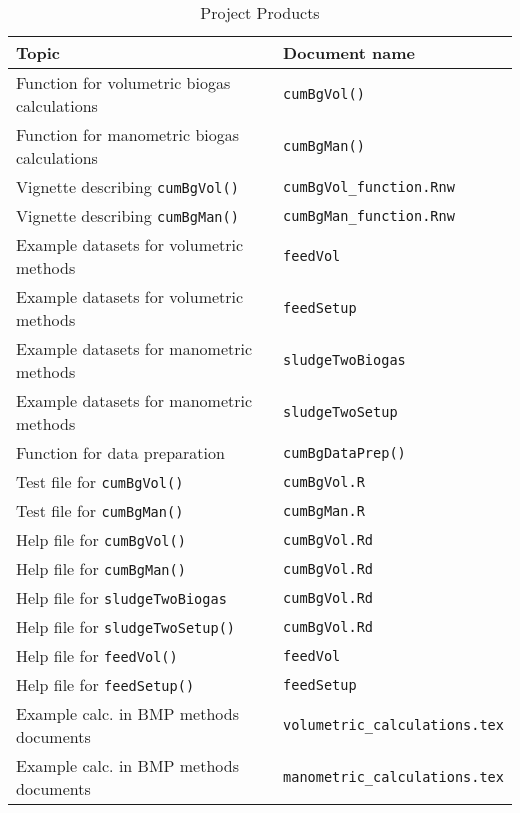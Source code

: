 \documentclass{article}
\begin{document}
\label{products}
\begin{table}[!h]
  \begin{center}
  \caption{Project Products}
  \label{tab:products}
  \vspace{3pt}
  
  \begin{tabular}{ll}
    \hline
    Topic                                         &   Document name \\
    \hline
    Function for volumetric biogas calculations   &   \texttt{cumBgVol()} \\
    Function for manometric biogas calculations   &   \texttt{cumBgMan()} \\
    Vignette describing \texttt{cumBgVol()}       &   \texttt{cumBgVol\_function.Rnw} \\
    Vignette describing \texttt{cumBgMan()}       &   \texttt{cumBgMan\_function.Rnw} \\
    Example datasets for volumetric methods       &   \texttt{feedVol} \\
    Example datasets for volumetric methods       &   \texttt{feedSetup} \\
    Example datasets for manometric methods       &   \texttt{sludgeTwoBiogas} \\ 
    Example datasets for manometric methods       &   \texttt{sludgeTwoSetup} \\
    Function for data preparation                 &   \texttt{cumBgDataPrep()} \\
    Test file for \texttt{cumBgVol()}             &   \texttt{cumBgVol.R} \\
    Test file for \texttt{cumBgMan()}             &   \texttt{cumBgMan.R} \\
    Help file for \texttt{cumBgVol()}             &   \texttt{cumBgVol.Rd} \\
    Help file for \texttt{cumBgMan()}             &   \texttt{cumBgVol.Rd} \\
    Help file for \texttt{sludgeTwoBiogas}        &   \texttt{cumBgVol.Rd} \\
    Help file for \texttt{sludgeTwoSetup()}       &   \texttt{cumBgVol.Rd} \\
    Help file for \texttt{feedVol()}              &   \texttt{feedVol} \\
    Help file for \texttt{feedSetup()}            &   \texttt{feedSetup} \\
    Example calc. in BMP methods documents        &   \texttt{volumetric\_calculations.tex} \\
    Example calc. in BMP methods documents        &   \texttt{manometric\_calculations.tex} \\
    \hline
  \end{tabular}
  \end{center}
\end{table}
\end{document}
